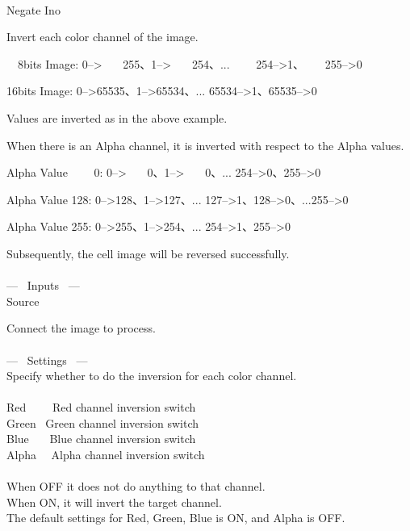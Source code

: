 \documentclass[a4paper,12pt]{article}
\begin{document}
\thispagestyle{empty}

\Large
\noindent \\
Negate Ino\medskip
\par
\normalsize
Invert each color channel of the image.\\
\par
\ \ 8bits Image: 0--> \ \ \ 255、1--> \ \ \, 254、... \ \ \ \ 254-->1、 \ \ \, 255-->0\par
16bits Image: 0-->65535、1-->65534、... 65534-->1、65535-->0\par
Values are inverted as in the above example.\\
\par
When there is an Alpha channel, it is inverted with respect to the Alpha values.\par
Alpha Value \ \ \ \ 0: 0--> \ \ \, 0、1--> \ \ \ 0、... 254-->0、255-->0\par
Alpha Value 128: 0-->128、1-->127、... 127-->1、128-->0、...255-->0\par
Alpha Value 255: 0-->255、1-->254、... 254-->1、255-->0\par
Subsequently, the cell image will be reversed successfully.\\
\\
--- \ Inputs \ ---\\
Source\par
Connect the image to process.\\
\\
--- \ Settings \ ---\\
Specify whether to do the inversion for each color channel.\\
\\
Red \ \ \ \, Red channel inversion switch\\
Green \ Green channel inversion switch\\
Blue \ \ \, Blue channel inversion switch\\
Alpha \ \ Alpha channel inversion switch\\
\\
When OFF it does not do anything to that channel.\\
When ON, it will invert the target channel.\\
The default settings for Red, Green, Blue is ON, and Alpha is OFF.
\end{document}
